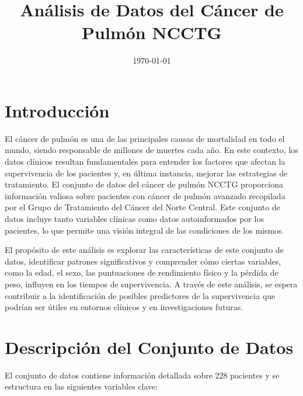 \documentclass[a4paper,12pt]{article}
\title{Análisis de Datos del Cáncer de Pulmón NCCTG}
\author{}
\date{\today}
\begin{document}
	
	\maketitle
	
	\section*{Introducción}
	El cáncer de pulmón es una de las principales causas de mortalidad en todo el mundo, siendo responsable de millones de muertes cada año. En este contexto, los datos clínicos resultan fundamentales para entender los factores que afectan la supervivencia de los pacientes y, en última instancia, mejorar las estrategias de tratamiento. El conjunto de datos del cáncer de pulmón NCCTG proporciona información valiosa sobre pacientes con cáncer de pulmón avanzado recopilada por el Grupo de Tratamiento del Cáncer del Norte Central. Este conjunto de datos incluye tanto variables clínicas como datos autoinformados por los pacientes, lo que permite una visión integral de las condiciones de los mismos.
	
	El propósito de este análisis es explorar las características de este conjunto de datos, identificar patrones significativos y comprender cómo ciertas variables, como la edad, el sexo, las puntuaciones de rendimiento físico y la pérdida de peso, influyen en los tiempos de supervivencia. A través de este análisis, se espera contribuir a la identificación de posibles predictores de la supervivencia que podrían ser útiles en entornos clínicos y en investigaciones futuras.
	
	\section*{Descripción del Conjunto de Datos}
	El conjunto de datos contiene información detallada sobre 228 pacientes y se estructura en las siguientes variables clave:
	
\end{document}
